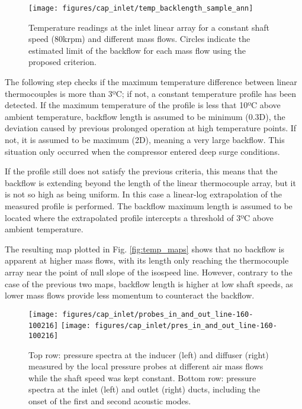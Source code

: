 \begin{figure}[thb!]
\centering
\texttt{[image: figures/cap\_inlet/temp\_backlength\_sample\_ann]}
\caption{Temperature readings at the inlet linear array for a constant shaft speed (80krpm) and different mass flows. Circles indicate the estimated limit of the backflow for each mass flow using the proposed criterion.}
\label{fig:temp_backlength_sample}
\end{figure}

The following step checks if the maximum temperature difference between linear thermocouples is more than 3ºC; if not,  a constant temperature profile has been detected. If the maximum temperature of the profile is less that 10ºC above ambient temperature, backflow length is assumed to be minimum (0.3D), the deviation caused by previous prolonged operation at high temperature points. If not, it is assumed to be maximum (2D), meaning a very large backflow. This situation only occurred when the compressor entered deep surge conditions.

If the profile still does not satisfy the previous criteria, this means that the backflow is extending beyond the length of the linear thermocouple array, but it is not so high as being uniform. In this case a linear-log extrapolation of the measured profile is performed. The backflow maximum length is assumed to be located where the extrapolated profile intercepts a threshold of 3ºC above ambient temperature.

The resulting map plotted in Fig. \ref{fig:temp_maps} shows that no backflow is apparent at higher mass flows, with its length only reaching the thermocouple array near the point of null slope of the isospeed line. However, contrary to the case of the previous two maps, backflow length is higher at low shaft speeds, as lower mass flows provide less momentum to counteract the backflow.

\begin{figure}[tb!]
\texttt{[image: figures/cap\_inlet/probes\_in\_and\_out\_line-160-100216]}
\texttt{[image: figures/cap\_inlet/pres\_in\_and\_out\_line-160-100216]}
\caption{Top row: pressure spectra at the inducer (left) and diffuser (right) measured by the local pressure probes at different air mass flows while the shaft speed was kept constant. Bottom row: pressure spectra at the inlet (left) and outlet (right) ducts, including the onset of the first and second acoustic modes.}
\label{fig:probes_all}
\end{figure}

